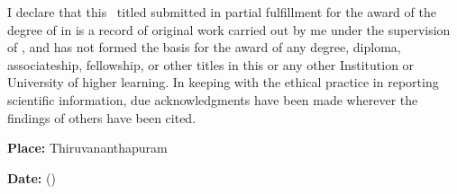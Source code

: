 I declare that this \Doctype \ titled \textbf{\textit{\Title}}
submitted in partial fulfillment for the award of the degree of
{\bf\Degreetext} in {\bf\Specialization} is a record of original work
carried out by me under the supervision of {\bf\Advisor}, and has not
formed the basis for the award of any degree, diploma, associateship,
fellowship, or other titles in this or any other Institution or
University of higher learning. In keeping with the ethical practice in
reporting scientific information, due acknowledgments have been made
wherever the findings of others have been cited.

\vspace{15mm}

\noindent\textbf{Place: }Thiruvananthapuram\hfill \Author \hspace{5mm}

\noindent\textbf{Date: }\Date \hfill (\Studentid)\hspace{3mm}
